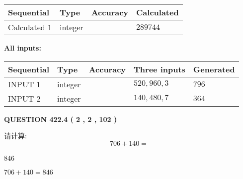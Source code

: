 \documentclass{ctexart}
\begin{document}
   
  
  
\noindent\begin{tabular}{|l|l|l|l|}
\hline
 Sequential & Type & Accuracy & Calculated \\ 
\hline
 
 
  Calculated $  1 $ & integer &  & 
  $ 289744 $ 
 \\  \hline  
 \end{tabular}
   
   
   
   
\noindent\vspace{0.1in}\hspace{-0.08in} {\textbf{\Large{All inputs: }}}
   
   
  
  
\noindent\begin{tabular}{|l|l|l|l|l|}
\hline
 Sequential & Type & Accuracy & Three inputs & Generated \\ 
\hline
 
 
  INPUT $  1 $ & integer &  & $
 520
 , 
 960
 , 
 3
 $ & $ 796 $ 
 \\  \hline  
 
 
  INPUT $  2 $ & integer &  & $
 140
 , 
 480
 , 
 7
 $ & $ 364 $ 
 \\  \hline  
 \end{tabular}
   
   
  
\vspace{0.2in}
  
{\textbf{\Large{QUESTION
422.4 
 ( 2 , 2 , 102 )
}}}
  
  
 
请计算:
\begin{equation}
706 +  %
140 = \nonumber
\end{equation}
 
 
 
\noindent{}
 
 

846
 
 
\noindent{}
 
 

 
 
 
\noindent{}
 
 

$ %
706 +  %
140=   %
846$
 
\end{document}
